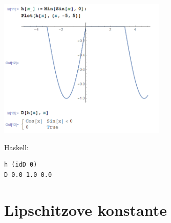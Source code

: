 \documentclass[9pt,table]{beamer}
\begin{document}
\begin{frame}[fragile]
\frametitle{}
\includegraphics[width=8cm]{graf4.png}

\pause
Haskell:
\begin{verbatim}
h (idD 0)
D 0.0 1.0 0.0
\end{verbatim}
\end{frame}


\section{Lipschitzove konstante}

\begin{frame}
\frametitle{}

\end{frame}
\end{document}
